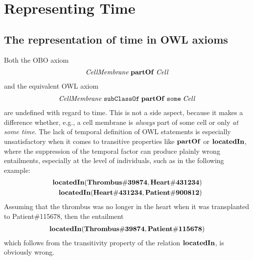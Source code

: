 \section*{Representing Time}

\subsection*{The representation of time in OWL axioms}

Both the OBO axiom
%
\begin{equation}
\begin{split}
\mathit{CellMembrane}\;\mathrm{\mathbf{partOf}}\;\mathit{Cell}
\end{split}
\label{eq:cellobo}
\end{equation}  
%
and the equivalent OWL axiom
%
\begin{equation}
\begin{split}
\mathit{CellMembrane}\;\mathtt{subClassOf}\;\mathrm{\mathbf{partOf}}\;\mathtt{some}\;\mathit{Cell}
\end{split}
\label{eq:celldl}
\end{equation}  
%
are undefined with regard to time. This is not a side aspect, because it makes a
difference whether, e.g., a cell membrane is \emph{always} part of some cell or
only \emph{at some time}.
The lack of temporal definition of OWL statements is especially unsatisfactory
when it comes to transitive properties like $\mathrm{\mathbf{partOf}}$ or $\mathrm{\mathbf{locatedIn}}$,
where the suppression of the temporal factor can produce plainly wrong entailments,
especially at the level of individuals, such as in the following example:
%
\begin{equation}
\begin{split}
\mathrm{\mathbf{locatedIn}} (\mathrm{\mathbf{Thrombus\#39874}}, \mathrm{\mathbf{Heart\#431234}})  \\
\mathrm{\mathbf{locatedIn}} (\mathrm{\mathbf{Heart\#431234}}, \mathrm{\mathbf{Patient\#900812}})
\end{split}
\label{eq:trans}
\end{equation}
%
Assuming that the thrombus was no longer in the heart when it was transplanted to Patient\#115678, then the entailment
%
\begin{equation}
\begin{split}
\mathrm{\mathbf{locatedIn}} (\mathrm{\mathbf{Thrombus\#39874}}, \mathrm{\mathbf{Patient\#115678}})
\end{split}
\label{eq:transEntailment}
\end{equation}
%
which follows from the transitivity property of the relation $\mathrm{\mathbf{locatedIn}}$, is obviously wrong.

